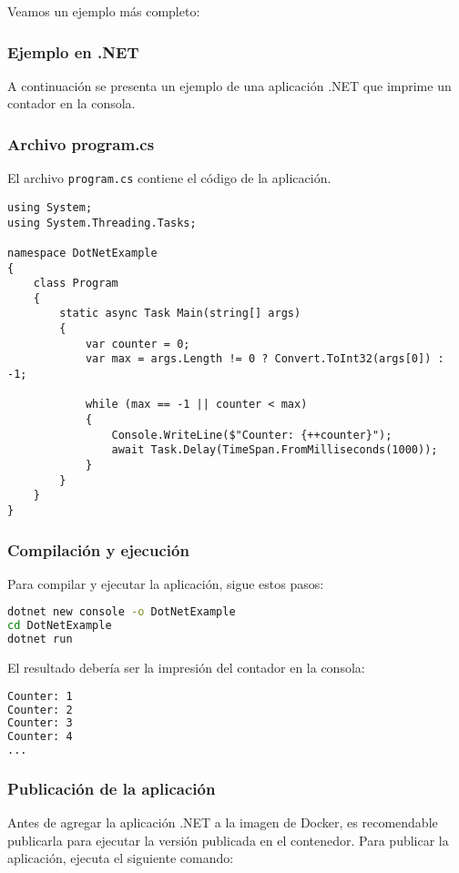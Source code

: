 \documentclass{article}
\begin{document}
Veamos un ejemplo más completo:

\subsubsection{Ejemplo en .NET}
A continuación se presenta un ejemplo de una aplicación .NET que imprime un contador en la consola.

\subsubsection*{Archivo program.cs}
El archivo \texttt{program.cs} contiene el código de la aplicación.

\begin{lstlisting}[language={[Sharp]C}]
using System;
using System.Threading.Tasks;

namespace DotNetExample
{
    class Program
    {
        static async Task Main(string[] args)
        {
            var counter = 0;
            var max = args.Length != 0 ? Convert.ToInt32(args[0]) : -1;
            
            while (max == -1 || counter < max)
            {
                Console.WriteLine($"Counter: {++counter}");
                await Task.Delay(TimeSpan.FromMilliseconds(1000));
            }
        }
    }
}
\end{lstlisting}

\subsubsection*{Compilación y ejecución}
Para compilar y ejecutar la aplicación, sigue estos pasos:

\begin{lstlisting}[language=bash]
dotnet new console -o DotNetExample
cd DotNetExample
dotnet run
\end{lstlisting}

El resultado debería ser la impresión del contador en la consola:

\begin{lstlisting}[language=bash]
Counter: 1
Counter: 2
Counter: 3
Counter: 4
...
\end{lstlisting}

\subsubsection*{Publicación de la aplicación}
Antes de agregar la aplicación .NET a la imagen de Docker, es recomendable publicarla para ejecutar la versión publicada en el contenedor. Para publicar la aplicación, ejecuta el siguiente comando:
\end{document}
